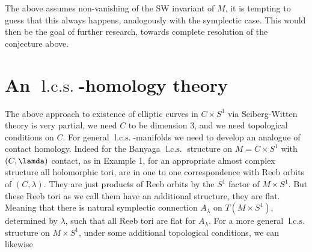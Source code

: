 \documentclass{amsart}
\numberwithin{equation}{section}
\theoremstyle{definition}
\theoremstyle{remark}
\DeclareMathOperator{\lcs}{l.c.s.}
\begin{document}
The above assumes non-vanishing of the SW invariant of $M$, it is tempting to guess that this always happens, analogously with the symplectic case. This would then be the goal of further research, towards complete resolution of the conjecture above. 
\section {An $\lcs$-homology theory} The above approach to existence of elliptic curves in $C \times S ^{1} $ via Seiberg-Witten theory is very partial, we need $C$ to be dimension 3, and we need topological conditions on $C$. For general $\lcs$-manifolds we need to develop an analogue of contact homology. Indeed for the Banyaga $\lcs$ structure on $M=C\times S ^{1} $ with $(C, \lamda)$ contact, as in Example 1, for an appropriate almost complex structure all holomorphic tori, are in one to one correspondence with Reeb orbits of $(C, \lambda)$. They are just products of Reeb orbits by the $S ^{1} $ factor of $M \times S ^{1} $.
But these Reeb tori as we call them have an additional structure, they are flat.
Meaning that there is natural symplectic connection $A _{\lambda} $ on  $T(M \times S ^{1}) $, determined by $\lambda$, such that all Reeb tori are flat for $A _{\lambda} $. For a more general $\lcs$ structure on $M \times S ^{1} $, under some additional topological conditions, we can likewise 

  
   
%  
\end{document}
